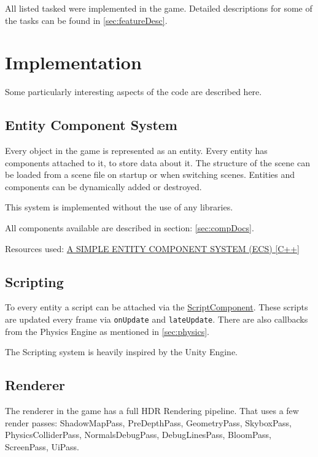 \documentclass{article}
\begin{document}
    All listed tasked were implemented in the game. Detailed descriptions for some of the tasks can be found in \ref{sec:featureDesc}.

    \section{Implementation}

    Some particularly interesting aspects of the code are described here.

    \subsection{Entity Component System}

    Every object in the game is represented as an entity. Every entity has components attached to it, to store data about it. The structure of the scene can be loaded from a scene file on startup or when switching scenes. Entities and components can be dynamically added or destroyed.

    This system is implemented without the use of any libraries.

    All components available are described in section: \ref{sec:compDocs}.

    Resources used: \href{https://austinmorlan.com/posts/entity_component_system/}{A SIMPLE ENTITY COMPONENT SYSTEM (ECS) [C++]}

    \subsection{Scripting}

    To every entity a script can be attached via the \href{https://github.com/Liioooo/cgue23-pac3D/blob/master/docs/md/COMPONENTS_DOCS.md#scriptcomponent}{ScriptComponent}. These scripts are updated every frame via \verb|onUpdate| and \verb|lateUpdate|. There are also callbacks from the Physics Engine as mentioned in \ref{sec:physics}.

    The Scripting system is heavily inspired by the Unity Engine.

    \subsection{Renderer}

    The renderer in the game has a full HDR Rendering pipeline. That uses a few render passes: ShadowMapPass, PreDepthPass, GeometryPass, SkyboxPass, PhysicsColliderPass, NormalsDebugPass, DebugLinesPass, BloomPass, ScreenPass, UiPass.
\end{document}
